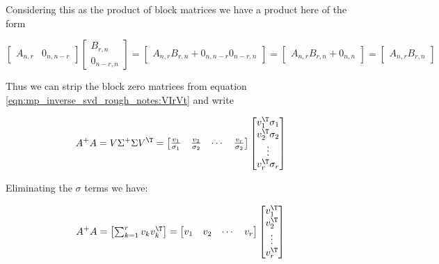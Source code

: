 Considering this as the product of block matrices we have a product here of the form

\[
\begin{bmatrix}
A_{n,r} & 0_{n,n-r}
\end{bmatrix}
\begin{bmatrix}
B_{r,n} \\ 0_{n-r,n}
\end{bmatrix}
=
\begin{bmatrix}
A_{n,r} B_{r,n} + 0_{n,n-r} 0_{n-r,n}
\end{bmatrix}
=
\begin{bmatrix}
A_{n,r} B_{r,n} + 0_{n,n}
\end{bmatrix}
=
\begin{bmatrix}
A_{n,r} B_{r,n}
\end{bmatrix}
\]

Thus we can strip the block zero matrices from equation \ref{eqn:mp_inverse_svd_rough_notes:VIrVt} and write

\begin{equation}\label{eqn:mp_inverse_svd_rough_notes:pseudoinversetimesmatrix}
A^{+} A =
V \Sigma^{+} \Sigma V^\T 
=
\begin{bmatrix}
\frac{v_1}{\sigma_1} & \frac{v_2}{\sigma_2} & \cdots & \frac{v_r}{\sigma_2} 
\end{bmatrix}
\begin{bmatrix}
v_1^\T \sigma_1 \\ v_2^\T \sigma_2 \\ \vdots \\ v_r^\T \sigma_r 
\end{bmatrix}
\end{equation}

Eliminating the $\sigma$ terms we have:

\begin{equation}\label{eqn:mp_inverse_svd_rough_notes:pseudoinversetimesmatrixsum}
A^{+} A =
\begin{bmatrix}
\sum_{k=1}^r {v_k}v_k^\T
\end{bmatrix}
=
\begin{bmatrix}
v_1 & v_2 & \cdots & v_r 
\end{bmatrix}
\begin{bmatrix}
v_1^\T \\ v_2^\T \\ \vdots \\ v_r^\T 
\end{bmatrix}
\end{equation}


